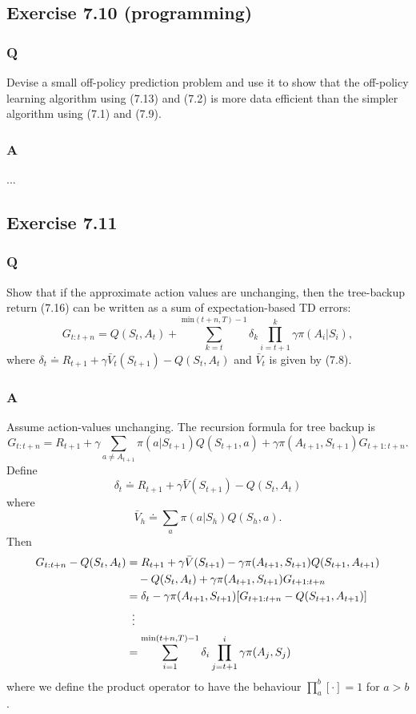 \subsection{Exercise 7.10 (programming)}
\subsubsection*{Q}
Devise a small off-policy prediction problem and use it to show that the off-policy learning algorithm using (7.13) and (7.2) is more data efficient than the simpler algorithm using (7.1) and (7.9).
\subsubsection*{A}
...

\subsection{Exercise 7.11}
\subsubsection*{Q}
Show that if the approximate action values are unchanging, then the tree-backup return (7.16) can be written as a sum of expectation-based TD errors:
\[
    G_{t:t+n} = Q(S_t, A_t) + \sum_{k=t}^{\textrm{min}(t+n, T)-1}\delta_k \prod_{i=t+1}^k \gamma \pi(A_i \vert S_i),
\]
where $\delta_t \doteq R_{t+1} + \gamma \bar{V}_t(S_{t+1}) - Q(S_t, A_t)$ and $\bar{V}_t$ is given by (7.8).

\subsubsection*{A}
Assume action-values unchanging. The recursion formula for tree backup is 
\[
    G_{t:t+n} = R_{t+1} + \gamma \sum_{a \neq A_{t+1}} \pi(a \vert S_{t+1}) Q(S_{t+1}, a) + \gamma \pi(A_{t+1}, S_{t+1}) G_{t+1:t+n}.
\]
Define
\[
    \delta_t \doteq R_{t+1} + \gamma \bar{V}(S_{t+1}) - Q(S_t, A_t)
\]
where
\[
    \bar{V}_h \doteq \sum_a \pi(a \vert S_h)Q(S_h, a).
\]
Then
\begin{align*}
    G_{t:t+n} - Q(S_t, A_t) &= R_{t+1} + \gamma \bar{V}(S_{t+1}) - \gamma \pi(A_{t+1}, S_{t+1})Q(S_{t+1}, A_{t+1}) \\
                            &\quad - Q(S_t, A_t) + \gamma \pi(A_{t+1}, S_{t+1})G_{t+1:t+n} \\
                            &= \delta_t - \gamma \pi(A_{t+1}, S_{t+1}) [G_{t+1:t+n} - Q(S_{t+1}, A_{t+1})] \\
                            &\vdotswithin{=}\\
                            &=\sum_{i=1}^{\textrm{min}(t+n, T)-1} \delta_i \prod_{j=t+1}^i \gamma \pi(A_j, S_j)
\end{align*}
where we define the product operator to have the behaviour $\prod_a^b[\cdot] = 1$ for $a > b$.
                                        



